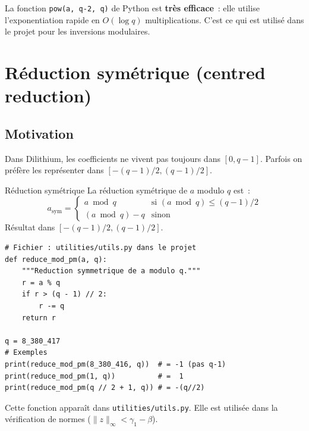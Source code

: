 \documentclass[12pt, a4paper]{article}
\begin{document}
\begin{importantbox}
La fonction \texttt{pow(a, q-2, q)} de Python est \textbf{très efficace}~:
elle utilise l'exponentiation rapide en $O(\log q)$ multiplications.
C'est ce qui est utilisé dans le projet pour les inversions modulaires.
\end{importantbox}

\section{Réduction symétrique (centred reduction)}

\subsection{Motivation}

Dans Dilithium, les coefficients ne vivent pas toujours dans $[0, q-1]$.
Parfois on préfère les représenter dans $[-(q-1)/2, (q-1)/2]$.

\begin{defbox}{Réduction symétrique}
La réduction symétrique de $a$ modulo $q$ est~:
$$a_{\mathrm{sym}} = \begin{cases}
  a \bmod q & \text{si } (a \bmod q) \leq (q-1)/2\\
  (a \bmod q) - q & \text{sinon}
\end{cases}$$
Résultat dans $[-(q-1)/2, (q-1)/2]$.
\end{defbox}

\begin{lstlisting}[style=python]
# Fichier : utilities/utils.py dans le projet
def reduce_mod_pm(a, q):
    """Reduction symmetrique de a modulo q."""
    r = a % q
    if r > (q - 1) // 2:
        r -= q
    return r

q = 8_380_417
# Exemples
print(reduce_mod_pm(8_380_416, q))  # = -1 (pas q-1)
print(reduce_mod_pm(1, q))          # =  1
print(reduce_mod_pm(q // 2 + 1, q)) # = -(q//2)
\end{lstlisting}

\begin{importantbox}
Cette fonction apparaît dans \texttt{utilities/utils.py}.
Elle est utilisée dans la vérification de normes ($\|z\|_\infty < \gamma_1 - \beta$).
\end{importantbox}

\end{document}
